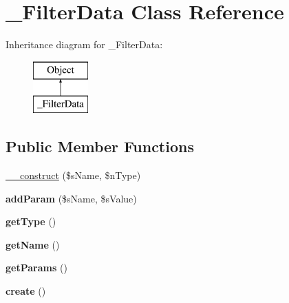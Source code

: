\hypertarget{class___filter_data}{\section{\-\_\-\-Filter\-Data Class Reference}
\label{class___filter_data}
}
Inheritance diagram for \-\_\-\-Filter\-Data\-:\begin{figure}[H]
\begin{center}
\leavevmode
\includegraphics[height=2.000000cm]{class___filter_data}
\end{center}
\end{figure}
\subsection*{Public Member Functions}
\begin{DoxyCompactItemize}
\item 
\hyperlink{class___filter_data_a6b373c4b713a73d15b7439cf480cd3d9}{\-\_\-\-\_\-construct} (\$s\-Name, \$n\-Type)
\item 
\hypertarget{class___filter_data_afba9288581d7692d2425c416ad5dcc10}{{\bfseries add\-Param} (\$s\-Name, \$s\-Value)}\label{class___filter_data_afba9288581d7692d2425c416ad5dcc10}

\item 
\hypertarget{class___filter_data_a87c60d937b7e8d13472713fedb86755a}{{\bfseries get\-Type} ()}\label{class___filter_data_a87c60d937b7e8d13472713fedb86755a}

\item 
\hypertarget{class___filter_data_a16f18c086d30553b90a7b6c47590d104}{{\bfseries get\-Name} ()}\label{class___filter_data_a16f18c086d30553b90a7b6c47590d104}

\item 
\hypertarget{class___filter_data_a2a854f9d8c0e09b3255e0a9aad14c0db}{{\bfseries get\-Params} ()}\label{class___filter_data_a2a854f9d8c0e09b3255e0a9aad14c0db}

\item 
\hypertarget{class___filter_data_a85d6329037f92a91d59dcce7f46a1389}{{\bfseries create} ()}\label{class___filter_data_a85d6329037f92a91d59dcce7f46a1389}

\end{DoxyCompactItemize}
